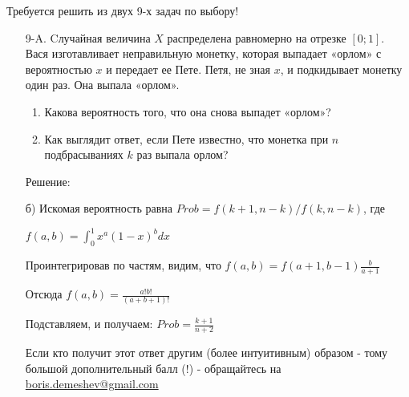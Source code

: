 \documentclass[12pt, a4paper]{article}\usepackage[]{graphicx}\usepackage[]{color}
\begin{document}
Требуется решить \textbf{} из двух 9-х задач по
выбору!

\begin{enumerate}
\item[9-A.] Cлучайная величина $X$ распределена равномерно на отрезке $[0;1]$. Вася изготавливает неправильную монетку, которая выпадает «орлом» с вероятностью  $x$ и передает ее Пете.
Петя, не зная $x$, и подкидывает монетку один раз. Она выпала
«орлом».
\begin{enumerate}
\item Какова вероятность того, что она снова выпадет
«орлом»?
\item Как выглядит ответ, если Пете известно, что монетка при
$n$ подбрасываниях  $k$  раз выпала орлом?
\end{enumerate}

Решение:

б) Искомая вероятность равна $Prob=f(k+1,n-k)/f(k,n-k)$, где

$f(a,b)=\int_{0}^{1}x^{a}(1-x)^{b}dx$

Проинтегрировав по частям, видим, что $f(a,b)=f(a+1,b-1)\frac{b}{a+1}$

Отсюда $f(a,b)=\frac{a!b!}{(a+b+1)!}$

Подставляем, и получаем: $Prob=\frac{k+1}{n+2}$

Если кто получит этот ответ другим (более интуитивным) образом - тому большой дополнительный балл (!) - обращайтесь на \href{mailto:boris.demeshev@gmail.com}{boris.demeshev@gmail.com}



\end{enumerate}
\end{document}
